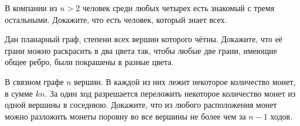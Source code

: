 \documentclass{article}
\begin{document}
\begin{enumerate_boxed}
        \item В компании из $n > 2$ человек среди любых четырех есть знакомый с тремя остальными.
        Докажите, что есть человек, который знает всех.

        \item Дан планарный граф, степени всех вершин которого чётны.
        Докажите, что её грани можно раскрасить в два цвета так, чтобы любые две грани, имеющие общее ребро, были покрашены в разные цвета.

        \item В связном графе $n$ вершин.
        В каждой из них лежит некоторое количество монет, в сумме $kn$.
        За один ход разрешается переложить некоторое количество монет из одной вершины в соседнюю.
        Докажите, что из любого расположения монет можно разложить монеты поровну во все вершины не более чем за $n - 1$ ходов.

    \end{enumerate_boxed}
\end{document}
